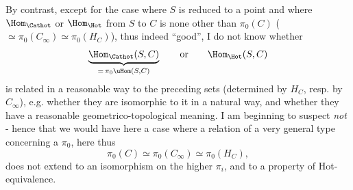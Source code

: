 By contrast, except for the case where $S$ is reduced to a point and where $\Hom_{\Cathot}$ or $\Hom_{\Hot}$ from $S$ to $C$ is none other than $\pi_{0}(C)$ ($\simeq \pi_{0}(C_{\infty}) \simeq \pi_{0}(H_{C})$), thus indeed ``good'', I do not know whether
\[
\underbrace{\Hom_{\Cathot}(S,C)}_{=\,\pi_{0}\uHom(S,C)} \qquad \text{or} \qquad \Hom_{\Hot}(S,C)
\]
is related in a reasonable way to the preceding sets (determined by $H_{C}$, resp. by $C_{\infty}$), e.g. whether they are isomorphic to it in a natural way, and whether they have a reasonable geometrico-topological meaning. I am beginning to suspect \textit{not} - hence that we would have here a case where a relation of a very general type concerning a $\pi_{0}$, here thus
\[
\pi_{0}(C) \simeq \pi_{0}(C_{\infty}) \simeq \pi_{0}(H_{C}),
\]
does not extend to an isomorphism on the higher $\pi_{i}$, and to a property of Hot-equivalence.